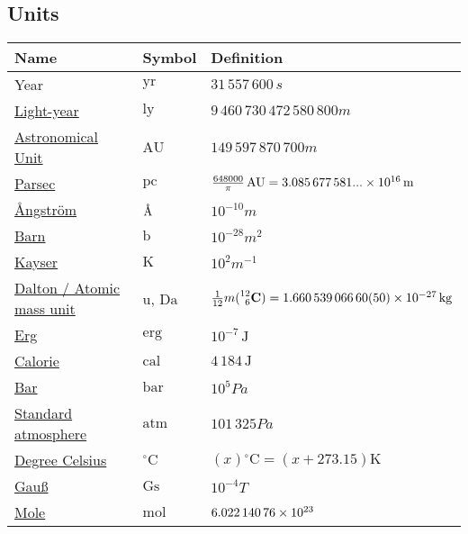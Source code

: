 	\subsection{Units}
		\begin{center}
			\begin{tabular}{| L{.35\textwidth} L{.15\textwidth} L{.4\textwidth} |}
				\hline
				Name & Symbol & Definition \\ \hline \hline
				Year & $\mathrm{yr}$ & $31\,557\,600\,\unit{s}$ \\ \hline
				\href{https://en.wikipedia.org/wiki/Light-year}{Light-year} & $\mathrm{ly}$ & $9\,460\,730\,472\,580\,800\unit{m}$ \\ \hline
				\href{https://en.wikipedia.org/wiki/Astronomical_unit}{Astronomical Unit} & $\mathrm{AU}$ & $149\,597\,870\,700\unit{m}$ \\ \hline
				\href{https://en.wikipedia.org/wiki/Parsec}{Parsec} & $\mathrm{pc}$ & $\frac{648000}{\pi}\,\mathrm{AU} = 3.085\,677\,581...\times 10^{16}\,\mathrm{m}$ \\ \hline
				\href{https://en.wikipedia.org/wiki/Angstrom}{\r{A}ngström} & ${\mbox{\normalfont\AA}}$ & $10^{-10}\unit{m}$ \\ \hline
				\href{https://en.wikipedia.org/wiki/Barn_(unit)}{Barn} & $\mathrm{b}$ & $10^{-28}\unit{m^2}$ \\ \hline
				\href{https://en.wikipedia.org/wiki/Wavenumber#In_spectroscopy}{Kayser} & $\mathrm{K}$ & $10^2\unit{m^{-1}}$ \\ \hline
				\href{https://en.wikipedia.org/wiki/Dalton_(unit)}{Dalton / Atomic mass unit} & $\mathrm{u}$, $\mathrm{Da}$ & $\frac{1}{12}m(\prescript{12}{6}{\mathbf{C}}) = 1.660\,539\,066\,60(50)\times 10^{-27}\,\mathrm{kg}$ \\ \hline
				\href{https://en.wikipedia.org/wiki/Erg}{Erg} & $\mathrm{erg}$ & $10^{-7}\,\mathrm{J}$ \\ \hline
				\href{https://en.wikipedia.org/wiki/Calorie}{Calorie} & $\mathrm{cal}$ & $4\,184\,\mathrm{J}$ \\ \hline
				\href{https://en.wikipedia.org/wiki/Bar_(unit)}{Bar} & $\mathrm{bar}$ & $10^5\unit{Pa}$ \\ \hline
				\href{https://en.wikipedia.org/wiki/Standard_atmosphere_(unit)}{Standard atmosphere} & $\mathrm{atm}$ & $101\,325\unit{Pa}$ \\ \hline
				\href{https://en.wikipedia.org/wiki/Celsius}{Degree Celsius} & $\mathrm{^\circ C}$ & $(x)\mathrm{^\circ C}=(x+273.15)\mathrm{K}$ \\ \hline
				\href{https://en.wikipedia.org/wiki/Gauss_(unit)}{Gauß} & $\mathrm{Gs}$ & $10^{-4}\unit{T}$ \\ \hline
				\href{https://en.wikipedia.org/wiki/Mole_(unit)}{Mole} & $\mathrm{mol}$ & $6.022\,140\,76\times 10^{23}$ \\ \hline
			\end{tabular}
		\end{center}

